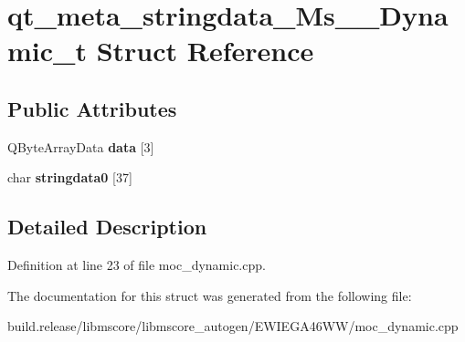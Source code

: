 \hypertarget{structqt__meta__stringdata___ms_____dynamic__t}{}\section{qt\+\_\+meta\+\_\+stringdata\+\_\+\+Ms\+\_\+\+\_\+\+Dynamic\+\_\+t Struct Reference}
\label{structqt__meta__stringdata___ms_____dynamic__t}
\subsection*{Public Attributes}
\begin{DoxyCompactItemize}
\item 
\mbox{\label{structqt__meta__stringdata___ms_____dynamic__t_a0d6c932d1f16ad982ca6087063e19b92}} 
Q\+Byte\+Array\+Data {\bfseries data} \mbox{[}3\mbox{]}
\item 
\mbox{\label{structqt__meta__stringdata___ms_____dynamic__t_add29594694ed31ddc6ebeb792eaecc0e}} 
char {\bfseries stringdata0} \mbox{[}37\mbox{]}
\end{DoxyCompactItemize}


\subsection{Detailed Description}


Definition at line 23 of file moc\+\_\+dynamic.\+cpp.



The documentation for this struct was generated from the following file\+:\begin{DoxyCompactItemize}
\item 
build.\+release/libmscore/libmscore\+\_\+autogen/\+E\+W\+I\+E\+G\+A46\+W\+W/moc\+\_\+dynamic.\+cpp\end{DoxyCompactItemize}

